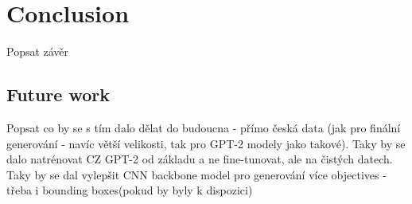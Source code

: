 \chapter*{Conclusion}

Popsat závěr

\section*{Future work}
Popsat co by se s tím dalo dělat do budoucna - přímo česká data (jak pro finální generování - navíc větší velikosti, tak pro GPT-2 modely jako takové). Taky by se dalo  natrénovat CZ GPT-2 od základu a ne fine-tunovat, ale na čistých datech. Taky by se dal vylepšit CNN backbone model pro generování více objectives - třeba i bounding boxes(pokud by byly k dispozici)
